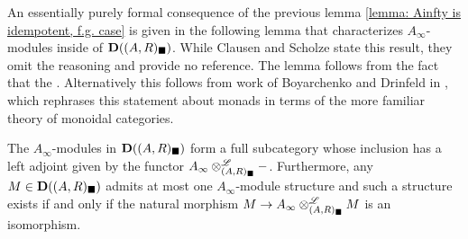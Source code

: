 An essentially purely formal consequence of the previous lemma \ref{lemma: Ainfty is idempotent, f.g. case} is given in the following lemma that characterizes $A_\infty$-modules inside of ${{\mathbf{D}}((A, R)_\blacksquare)}$. While Clausen and Scholze state this result, they omit the reasoning and provide no reference. The lemma follows from the fact that the . Alternatively this follows from work of Boyarchenko and Drinfeld in \cite{boyarchenko-drinfeld2009idempotents}, which rephrases this statement about monads in terms of the more familiar theory of monoidal categories.
\begin{lemma}
	\label{lemma: Ainfty-modules, f.g. case}
	
	The $A_\infty$-modules in ${{\mathbf{D}}((A, R)_\blacksquare)}$ form a full subcategory whose inclusion has a left adjoint given by the functor $A_\infty\otimes^{\mathscr{L}}_{(A, R)_\blacksquare} -$. Furthermore, any $M \in {{\mathbf{D}}((A, R)_\blacksquare)}$ admits at most one $A_\infty$-module structure and such a structure exists if and only if the natural morphism $M\to A_\infty\otimes^{\mathscr{L}}_{(A, R)_\blacksquare} M$ is an isomorphism.
\end{lemma}
